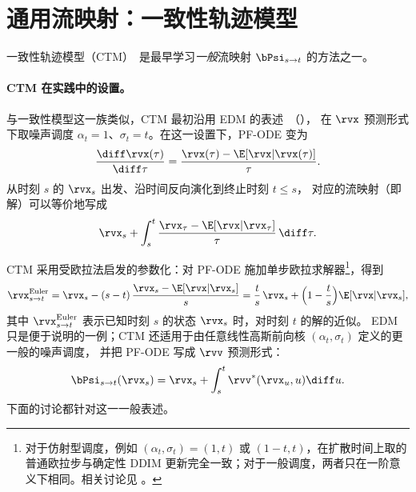 \section{\texorpdfstring{通用流映射：一致性轨迹模型}{通用流映射：一致性轨迹模型}}\label{sec:CTM}

一致性轨迹模型（CTM）~\citep{kim2023consistency}是最早学习\emph{一般}流映射 $\bPsi_{s\to t}$ 的方法之一。

\paragraph{CTM 在实践中的设置。}
与一致性模型这一族类似，CTM 最初沿用 EDM 的表述~\citep{karras2022elucidating}（），
在 $\rvx$ 预测形式下取噪声调度 $\alpha_t = 1$、$\sigma_t = t$。在这一设置下，PF-ODE 变为
\begin{align*}
    \frac{\diff \rvx(\tau)}{\diff \tau}
    = \frac{\rvx(\tau) - \E[\rvx|\rvx(\tau)]}{\tau}.
\end{align*}
从时刻 $s$ 的 $\rvx_s$ 出发、沿时间反向演化到终止时刻 $t\le s$，
对应的流映射（即解）可以等价地写成
\begin{align*}
\rvx_s + \int_s^t
    \frac{\rvx_\tau - \E[\rvx |\rvx_\tau]}{\tau}\, \diff \tau.
\end{align*}

CTM 采用受欧拉法启发的参数化：对 PF-ODE 施加单步欧拉求解器\footnote{对于仿射型调度，例如
$(\alpha_t,\sigma_t)=(1,t)$ 或 $(1-t,t)$，在扩散时间上取的普通欧拉步与确定性 DDIM 更新完全一致；对于一般调度，两者只在一阶意义下相同。相关讨论见 。}，得到
\[
\rvx_{s\to t}^{\mathrm{Euler}}
= \rvx_s - (s-t)\,\frac{\rvx_s - \E[\rvx|\rvx_s]}{s}
= \frac{t}{s}\,\rvx_s + \Big(1 - \frac{t}{s}\Big)\E[\rvx|\rvx_s],
\]
其中 $\rvx_{s\to t}^{\mathrm{Euler}}$ 表示已知时刻 $s$ 的状态 $\rvx_s$ 时，对时刻 $t$ 的解的近似。
EDM 只是便于说明的一例；CTM 还适用于由任意线性高斯前向核 $(\alpha_t, \sigma_t)$ 定义的更一般的噪声调度，
并把 PF-ODE 写成 $\rvv$ 预测形式：
\[
\bPsi_{s\to t}(\rvx_s)
= \rvx_s + \int_s^t \rvv^*(\rvx_u,u) \diff u.
\]
下面的讨论都针对这一一般表述。


